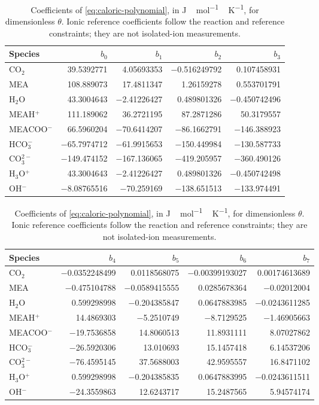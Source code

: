 \begin{table}[pos=htbp]
\centering\small
\caption{Coefficients of \cref{eq:caloric-polynomial}, in \unit{J\,mol^{-1}\,K^{-1}}, for dimensionless $\theta$. Ionic reference coefficients follow the reaction and reference constraints; they are not isolated-ion measurements.}
\label{tab:caloric-polynomial-coefficients}
\begin{tabular}{@{}lrrrr@{}}
\toprule
Species & $b_0$ & $b_1$ & $b_2$ & $b_3$\\
\midrule
CO$_2$ & \num{39.5392771} & \num{4.05693353} & \num{-0.516249792} & \num{0.107458931}\\
MEA & \num{108.889073} & \num{17.4811347} & \num{1.26159278} & \num{0.553701791}\\
H$_2$O & \num{43.3004643} & \num{-2.41226427} & \num{0.489801326} & \num{-0.450742496}\\
MEAH$^+$ & \num{111.189062} & \num{36.2721195} & \num{87.2871286} & \num{50.3179557}\\
MEACOO$^-$ & \num{66.5960204} & \num{-70.6414207} & \num{-86.1662791} & \num{-146.388923}\\
HCO$_3^-$ & \num{-65.7974712} & \num{-61.9915653} & \num{-150.449984} & \num{-130.587733}\\
CO$_3^{2-}$ & \num{-149.474152} & \num{-167.136065} & \num{-419.205957} & \num{-360.490126}\\
H$_3$O$^+$ & \num{43.3004643} & \num{-2.41226427} & \num{0.489801326} & \num{-0.450742498}\\
OH$^-$ & \num{-8.08765516} & \num{-70.259169} & \num{-138.651513} & \num{-133.974491}\\
\bottomrule
\end{tabular}
\par\medskip
\begin{tabular}{@{}lrrrr@{}}
\toprule
Species & $b_4$ & $b_5$ & $b_6$ & $b_7$\\
\midrule
CO$_2$ & \num{-0.0352248499} & \num{0.0118568075} & \num{-0.00399193027} & \num{0.00174613689}\\
MEA & \num{-0.475104788} & \num{-0.0589415555} & \num{0.0285678364} & \num{-0.02012004}\\
H$_2$O & \num{0.599298998} & \num{-0.204385847} & \num{0.0647883985} & \num{-0.0243611285}\\
MEAH$^+$ & \num{14.4869303} & \num{-5.2510749} & \num{-8.7129525} & \num{-1.46905663}\\
MEACOO$^-$ & \num{-19.7536858} & \num{14.8060513} & \num{11.8931111} & \num{8.07027862}\\
HCO$_3^-$ & \num{-26.5920306} & \num{13.010693} & \num{15.1457418} & \num{6.14537206}\\
CO$_3^{2-}$ & \num{-76.4595145} & \num{37.5688003} & \num{42.9595557} & \num{16.8471102}\\
H$_3$O$^+$ & \num{0.599298998} & \num{-0.204385835} & \num{0.0647883995} & \num{-0.0243611511}\\
OH$^-$ & \num{-24.3559863} & \num{12.6243717} & \num{15.2487565} & \num{5.94574174}\\
\bottomrule
\end{tabular}
\end{table}

